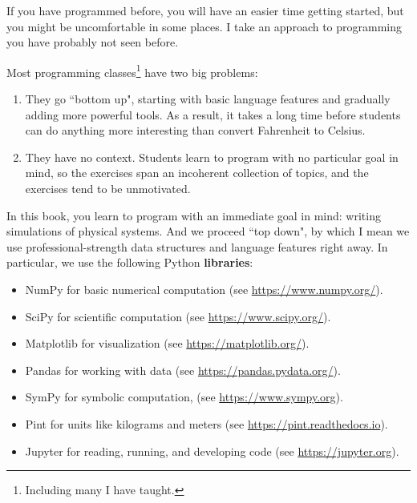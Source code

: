 \documentclass[12pt]{book}
\theoremstyle{exercise}
\begin{document}
If you have programmed before, you will have an easier time getting started, but you might be uncomfortable in some places.  I take an approach to programming you have probably not seen before.

Most programming classes\footnote{Including many I have taught.} have two big problems:

\begin{enumerate}

\item They go ``bottom up", starting with basic language features and gradually adding more powerful tools.  As a result, it takes a long time before students can do anything more interesting than convert Fahrenheit to Celsius.


\item They have no context.  Students learn to program with no particular goal in mind, so the exercises span an incoherent collection of topics, and the exercises tend to be unmotivated.

\end{enumerate}

In this book, you learn to program with an immediate goal in mind: writing simulations of physical systems.  And we proceed ``top down", by which I mean we use professional-strength data structures and language features right away.  In particular, we use the following Python {\bf libraries}:


\begin{itemize}

\item NumPy for basic numerical computation (see \url{https://www.numpy.org/}).


\item SciPy for scientific computation (see \url{https://www.scipy.org/}).


\item Matplotlib for visualization (see \url{https://matplotlib.org/}).


\item Pandas for working with data (see \url{https://pandas.pydata.org/}).


\item SymPy for symbolic computation, (see \url{https://www.sympy.org}).


\item Pint for units like kilograms and meters (see \url{https://pint.readthedocs.io}).


\item Jupyter for reading, running, and developing code (see \url{https://jupyter.org}).


\end{itemize}
\end{document}
